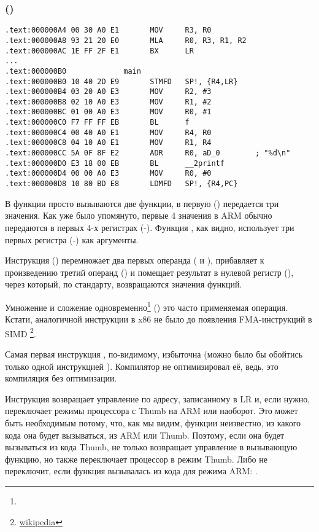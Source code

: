 \subsubsection{\NonOptimizingKeilVI (\ARMMode)}

\begin{lstlisting}[style=customasmARM]
.text:000000A4 00 30 A0 E1       MOV     R3, R0
.text:000000A8 93 21 20 E0       MLA     R0, R3, R1, R2
.text:000000AC 1E FF 2F E1       BX      LR
...
.text:000000B0             main
.text:000000B0 10 40 2D E9       STMFD   SP!, {R4,LR}
.text:000000B4 03 20 A0 E3       MOV     R2, #3
.text:000000B8 02 10 A0 E3       MOV     R1, #2
.text:000000BC 01 00 A0 E3       MOV     R0, #1
.text:000000C0 F7 FF FF EB       BL      f
.text:000000C4 00 40 A0 E1       MOV     R4, R0
.text:000000C8 04 10 A0 E1       MOV     R1, R4
.text:000000CC 5A 0F 8F E2       ADR     R0, aD_0        ; "%d\n"
.text:000000D0 E3 18 00 EB       BL      __2printf
.text:000000D4 00 00 A0 E3       MOV     R0, #0
.text:000000D8 10 80 BD E8       LDMFD   SP!, {R4,PC}
\end{lstlisting}

В функции \main просто вызываются две функции, в первую (\ttf) передается три значения.
Как уже было упомянуто, первые 4 значения в ARM обычно передаются в первых 4-х регистрах (-).
Функция \ttf, как видно, использует три первых регистра (-) как аргументы.

Инструкция  () перемножает два первых операнда ( и ), 
прибавляет к произведению
третий операнд () и помещает результат в нулевой регистр (), через который, по стандарту, 
возвращаются значения функций.

Умножение и сложение одновременно\footnote{\WPMAO} 
() это часто применяемая операция. Кстати, аналогичной
инструкции в x86 не было до появления FMA-инструкций в SIMD
\footnote{\href{http://go.yurichev.com/17103}{wikipedia}}.

Самая первая инструкция , по-видимому, избыточна (можно было бы обойтись только одной инструкцией ).
Компилятор не оптимизировал её, ведь, это компиляция без оптимизации.

Инструкция  возвращает управление по адресу, записанному в \ac{LR} и, если нужно, 
переключает режимы процессора с Thumb на ARM или наоборот.
Это может быть необходимым потому, что, как мы видим, 
функции \ttf неизвестно, из какого кода она будет вызываться, из ARM или Thumb.
Поэтому, если она будет вызываться из кода Thumb,  не только возвращает
управление в вызывающую функцию, но также переключает процессор в режим Thumb.
Либо не переключит, если функция вызывалась из кода для режима ARM: .

